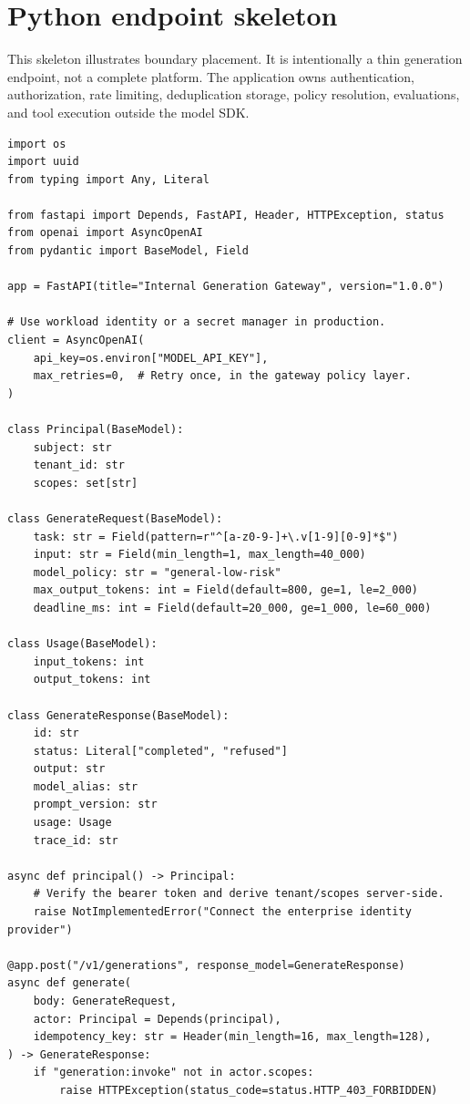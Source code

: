 \documentclass[10pt]{article}
\begin{document}
\section{Python endpoint skeleton}

This skeleton illustrates boundary placement. It is intentionally a thin generation endpoint, not a complete platform. The application owns authentication, authorization, rate limiting, deduplication storage, policy resolution, evaluations, and tool execution outside the model SDK.

\begin{lstlisting}[style=py]
import os
import uuid
from typing import Any, Literal

from fastapi import Depends, FastAPI, Header, HTTPException, status
from openai import AsyncOpenAI
from pydantic import BaseModel, Field

app = FastAPI(title="Internal Generation Gateway", version="1.0.0")

# Use workload identity or a secret manager in production.
client = AsyncOpenAI(
    api_key=os.environ["MODEL_API_KEY"],
    max_retries=0,  # Retry once, in the gateway policy layer.
)

class Principal(BaseModel):
    subject: str
    tenant_id: str
    scopes: set[str]

class GenerateRequest(BaseModel):
    task: str = Field(pattern=r"^[a-z0-9-]+\.v[1-9][0-9]*$")
    input: str = Field(min_length=1, max_length=40_000)
    model_policy: str = "general-low-risk"
    max_output_tokens: int = Field(default=800, ge=1, le=2_000)
    deadline_ms: int = Field(default=20_000, ge=1_000, le=60_000)

class Usage(BaseModel):
    input_tokens: int
    output_tokens: int

class GenerateResponse(BaseModel):
    id: str
    status: Literal["completed", "refused"]
    output: str
    model_alias: str
    prompt_version: str
    usage: Usage
    trace_id: str

async def principal() -> Principal:
    # Verify the bearer token and derive tenant/scopes server-side.
    raise NotImplementedError("Connect the enterprise identity provider")

@app.post("/v1/generations", response_model=GenerateResponse)
async def generate(
    body: GenerateRequest,
    actor: Principal = Depends(principal),
    idempotency_key: str = Header(min_length=16, max_length=128),
) -> GenerateResponse:
    if "generation:invoke" not in actor.scopes:
        raise HTTPException(status_code=status.HTTP_403_FORBIDDEN)


\end{lstlisting}
\end{document}
